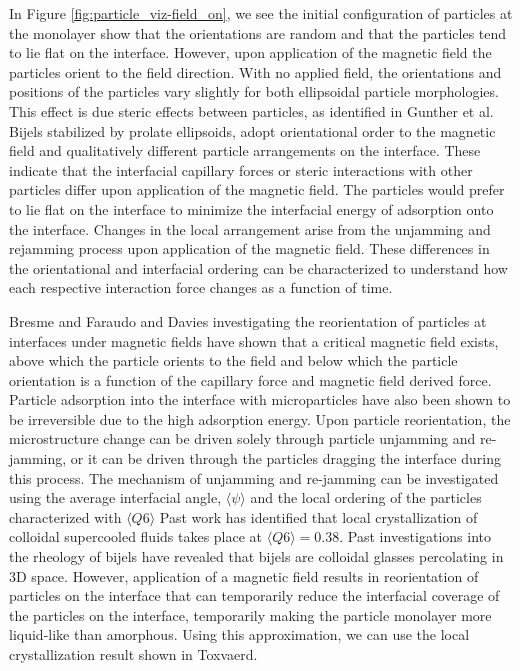 In Figure \ref{fig:particle_viz-field_on}, we see the initial configuration of particles at the monolayer show that the orientations are random and that the 
particles tend to lie flat on the interface. However, upon application of the magnetic field the particles orient to the field direction. With no applied field,
the orientations and positions of the particles vary slightly for both ellipsoidal particle morphologies. This effect is due steric effects between particles,
as identified in Gunther et al. \cite{gunther_timescales_2014} Bijels stabilized by prolate ellipsoids, adopt orientational order
to the magnetic field and qualitatively different particle arrangements on the interface. These indicate that the interfacial capillary forces or steric interactions 
with other particles differ upon application of the magnetic field. The particles would prefer to lie flat on the interface to minimize the interfacial energy of 
adsorption onto the interface. Changes in the local arrangement arise from the unjamming and rejamming process upon application of the magnetic field. These differences 
in the orientational and interfacial ordering can be characterized to understand how each respective interaction force changes as a function of time.

Bresme and Faraudo and Davies investigating the reorientation of particles at interfaces under magnetic fields have shown that a critical magnetic field exists, 
above which the particle orients to the field and below which the particle orientation is a function of the capillary force and magnetic field derived force. 
\cite{davies_interface_2014} \cite{bresme_orientational_2007} Particle adsorption into the interface with microparticles have also been shown to be irreversible due 
to the high adsorption energy. Upon particle reorientation, the microstructure change can be driven solely through particle unjamming and re-jamming, or it can be 
driven through the particles dragging the interface during this process. The mechanism of unjamming and re-jamming can be investigated using the average interfacial 
angle, $\langle \psi \rangle$ and the local ordering of the particles characterized with  $\langle Q6 \rangle$ Past work has identified that local crystallization 
of colloidal supercooled fluids takes place at \(\langle Q6 \rangle = 0.38\). \cite{toxvaerd_role_2020} Past investigations into the rheology of bijels have revealed
that bijels are colloidal glasses percolating in 3D space. \cite{ching_bijel_2022} However, application of a magnetic field results in reorientation of particles on
the interface that can temporarily reduce the interfacial coverage of the particles on the interface, temporarily making the particle monolayer more liquid-like
than amorphous. \cite{hunter_physics_2012} Using this approximation, we can use the local crystallization result shown in Toxvaerd.

